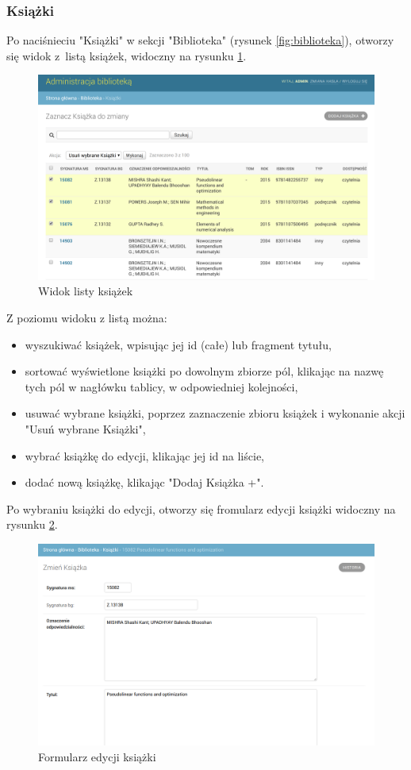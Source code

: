 \documentclass[twoside]{projektInzynierskiMS}
\begin{document}
\subsubsection{Książki}

Po naciśnieciu "Książki" w sekcji "Biblioteka" (rysunek \ref{fig:biblioteka}), otworzy się widok z~listą książek, widoczny na rysunku \ref{fig:adminBooks}. 

\begin{figure}[h]
  \centering
  \includegraphics[width=0.4\linewidth]{img/ListaKsiazek.png}
  \caption{Widok listy książek}
  \label{fig:adminBooks}
\end{figure}

Z poziomu widoku z listą można:
\begin{itemize}
	\item wyszukiwać książek, wpisując jej id (całe) lub fragment tytułu,
	\item sortować wyświetlone książki po dowolnym zbiorze pól, klikając na nazwę tych pól w nagłówku tablicy, w odpowiedniej kolejności,
	\item usuwać wybrane książki, poprzez zaznaczenie zbioru książek i wykonanie akcji "Usuń wybrane Książki",
	\item wybrać książkę do edycji, klikając jej id na liście,
	\item dodać nową książkę, klikając "Dodaj Książka +".
\end{itemize}

Po wybraniu książki do edycji, otworzy się fromularz edycji książki widoczny na rysunku \ref{fig:adminEditBook}.

\begin{figure}[h]
  \centering
  \includegraphics[width=0.4\linewidth]{img/EdycjaKsiazki.png}
  \caption{Formularz edycji książki}
  \label{fig:adminEditBook}
\end{figure}
\end{document}

